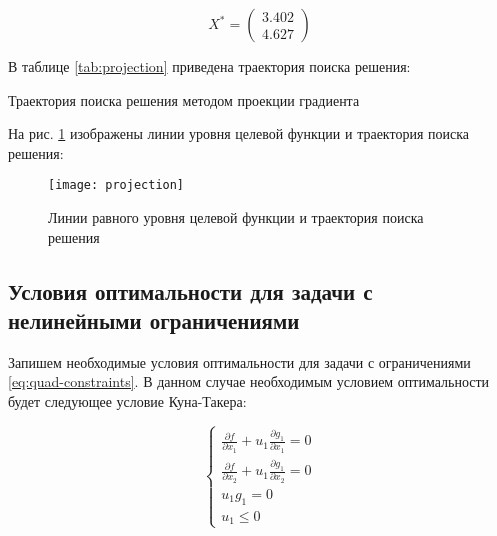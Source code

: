 \begin{equation*}
	X^{*} = \begin{pmatrix}
		3.402 \\ 4.627
	\end{pmatrix}
\end{equation*}

В таблице \ref{tab:projection} приведена траектория поиска решения:

\begin{table}[H]
\begin{center}
	\caption{Траектория поиска решения методом проекции градиента}
	\label{tab:projection}
	\def\tabcolsep{18pt}
	\def\arraystretch{1.5}
	\fontsize{13}{14}\selectfont
\end{center}
\end{table}

На рис. \ref{pic:projection} изображены линии уровня целевой функции и траектория поиска решения:

\begin{figure}[H]
\begin{center}
	\texttt{[image: projection]}
	\caption{Линии равного уровня целевой функции и траектория поиска решения}
	\label{pic:projection}
\end{center}
\end{figure}

\subsection{Условия оптимальности для задачи с нелинейными ограничениями}

Запишем необходимые условия оптимальности для задачи с ограничениями \ref{eq:quad-constraints}. В данном случае необходимым условием оптимальности будет следующее условие Куна-Такера:

\begin{equation*}
\begin{cases}
	\frac{\partial f}{\partial x_1} + u_1 \frac{\partial g_1}{\partial x_1} = 0
	\\
	\frac{\partial f}{\partial x_2} + u_1 \frac{\partial g_1}{\partial x_2} = 0
	\\
	u_1 g_1 = 0
	\\
	u_1 \leq 0
\end{cases}
\end{equation*}

